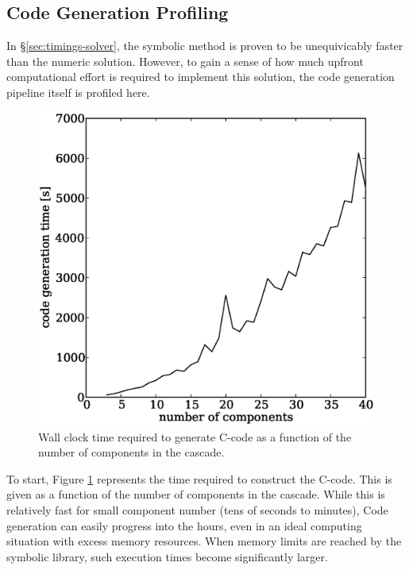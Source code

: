 \documentclass[preprint,12pt]{elsarticle}
\begin{document}
\subsection{Code Generation Profiling}
\label{sec:codegen-prof}
In \S\ref{sec:timings-solver}, the symbolic method is proven to be unequivicably
faster than the numeric solution.  However, to gain a sense of how much upfront 
computational effort is required to implement this solution, the code generation 
pipeline itself is profiled here.

\begin{figure}[htpb]
\begin{center}
\includegraphics[scale=0.5]{codegen_times.eps}
\caption{Wall clock time required to generate C-code as a function of the 
    number of components in the cascade.}
\label{codegen_times_fig}
\end{center}
\end{figure}

To start, Figure \ref{codegen_times_fig} represents the time required to construct 
the C-code.  This is given as a function of the number of components in the cascade.
While this is relatively fast for small component number (tens of seconds to minutes),
Code generation can easily progress into the hours, even in an ideal computing 
situation with excess memory resources.  When memory limits are reached by the 
symbolic library, such execution times become significantly larger.
\end{document}
